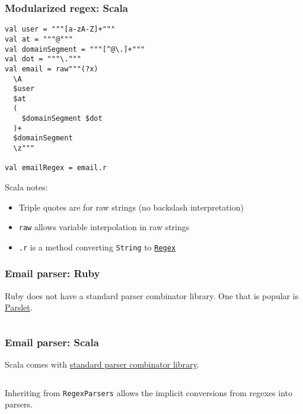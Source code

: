 \begin{frame}[fragile]
  \frametitle{Modularized regex: Scala}

  \begin{verbatim}
val user = """[a-zA-Z]+"""
val at = """@"""
val domainSegment = """[^@\.]+"""
val dot = """\."""
val email = raw"""(?x)
  \A
  $user
  $at
  (
    $domainSegment $dot
  )+
  $domainSegment
  \z"""

val emailRegex = email.r
  \end{verbatim}

  Scala notes:
  \begin{itemize}
    \item Triple quotes are for raw strings (no backslash interpretation)
    \item \texttt{raw} allows variable interpolation in raw strings
    \item \texttt{.r} is a method converting \texttt{String} to \href{http://www.scala-lang.org/api/current/index.html#scala.util.matching.Regex}{\texttt{Regex}}
  \end{itemize}
\end{frame}


\begin{frame}[fragile]
  \frametitle{Email parser: Ruby}

  Ruby does not have a standard parser combinator library. One that is popular is \href{http://kschiess.github.io/parslet/}{Parslet}.

  \inputminted{ruby}{ruby/lib/email_validator/parser.rb}
\end{frame}

\begin{frame}[fragile]
  \frametitle{Email parser: Scala}

  Scala comes with \href{http://www.scala-lang.org/api/current/index.html\#scala.util.parsing.combinator.Parsers}{standard parser combinator library}.

  \inputminted{scala}{extra/EmailParsers.scala}

  Inheriting from \texttt{RegexParsers} allows the implicit conversions from regexes into parsers.
\end{frame}


